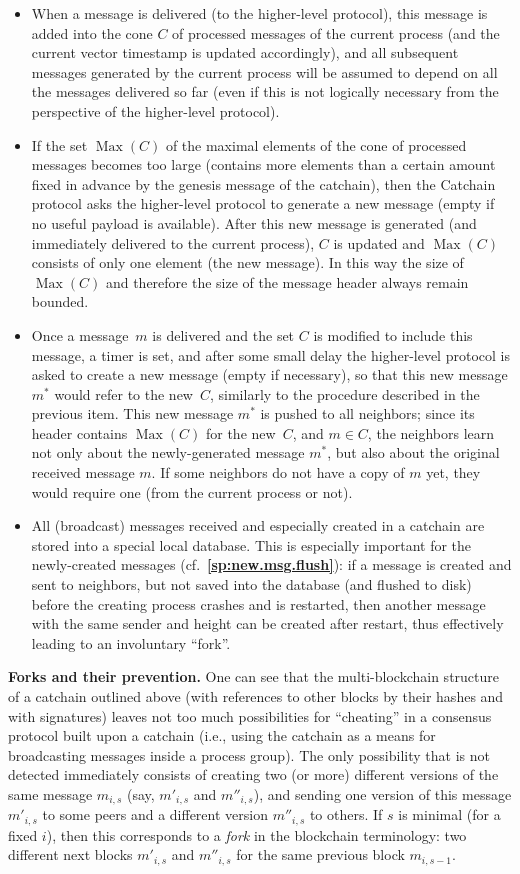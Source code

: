 \documentclass[12pt,oneside]{article}
\def\makepoint#1{\medbreak\noindent{\bf #1.\ }}
\def\nxpoint{\refstepcounter{subsection}%
  \smallbreak\makepoint{\thesubsection}}
\def\refpoint#1{{\rm\textbf{\ref{#1}}}}
\let\ptref=\refpoint
\def\emb#1{\textbf{#1.}}
\def\Max{\operatorname{Max}}
\begin{document}
\begin{itemize}
\item When a message is delivered (to the higher-level protocol), this message is added into the cone $C$ of processed messages of the current process (and the current vector timestamp is updated accordingly), and all subsequent messages generated by the current process will be assumed to depend on all the messages delivered so far (even if this is not logically necessary from the perspective of the higher-level protocol).
\item If the set $\Max(C)$ of the maximal elements of the cone of processed messages becomes too large (contains more elements than a certain amount fixed in advance by the genesis message of the catchain), then the Catchain protocol asks the higher-level protocol to generate a new message (empty if no useful payload is available). After this new message is generated (and immediately delivered to the current process), $C$ is updated and $\Max(C)$ consists of only one element (the new message). In this way the size of $\Max(C)$ and therefore the size of the message header always remain bounded.
\item Once a message~$m$ is delivered and the set $C$ is modified to include this message, a timer is set, and after some small delay the higher-level protocol is asked to create a new message (empty if necessary), so that this new message $m^*$ would refer to the new~$C$, similarly to the procedure described in the previous item. This new message $m^*$ is pushed to all neighbors; since its header contains $\Max(C)$ for the new~$C$, and $m\in C$, the neighbors learn not only about the newly-generated message $m^*$, but also about the original received message $m$. If some neighbors do not have a copy of $m$ yet, they would require one (from the current process or not).
\item All (broadcast) messages received and especially created in a catchain are stored into a special local database. This is especially important for the newly-created messages (cf.~\ptref{sp:new.msg.flush}): if a message is created and sent to neighbors, but not saved into the database (and flushed to disk) before the creating process crashes and is restarted, then another message with the same sender and height can be created after restart, thus effectively leading to an involuntary ``fork''.
\end{itemize}

\nxpoint\emb{Forks and their prevention}
One can see that the multi-blockchain structure of a catchain outlined above (with references to other blocks by their hashes and with signatures) leaves not too much possibilities for ``cheating'' in a consensus protocol built upon a catchain (i.e., using the catchain as a means for broadcasting messages inside a process group). The only possibility that is not detected immediately consists of creating two (or more) different versions of the same message $m_{i,s}$ (say, $m'_{i,s}$ and $m''_{i,s}$), and sending one version of this message $m'_{i,s}$ to some peers and a different version $m''_{i,s}$ to others. If $s$ is minimal (for a fixed $i$), then this corresponds to a {\em fork\/} in the blockchain terminology: two different next blocks $m'_{i,s}$ and $m''_{i,s}$ for the same previous block $m_{i,s-1}$.
\end{document}
